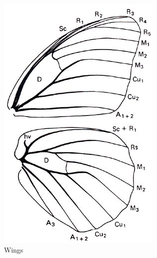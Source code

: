 \documentclass[letterpaper, 11pt]{article}
\begin{document}
\begin{figure}[ht!]
    \centering
    \begin{subfigure}[ht!]{0.28\textwidth}
        \includegraphics[width=\textwidth]{image09}
        \caption{Wings}
        \label{fig:nymphalid1}
    \end{subfigure}
    \qquad %
    \begin{subfigure}[ht!]{0.5\textwidth}

\end{subfigure}
\end{figure}
\end{document}
